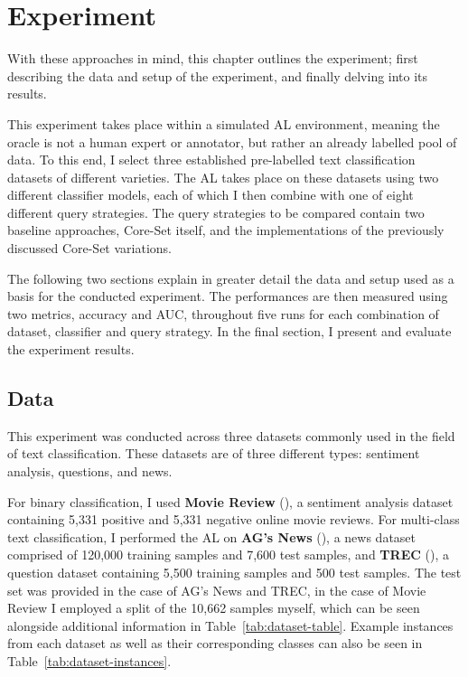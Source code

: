 \documentclass[english,bachelor,ul]{webisthesis} %
\begin{document}
\chapter{Experiment}

With these approaches in mind, this chapter outlines the experiment; first describing the data and setup of the experiment, and finally delving into its results. 

This experiment takes place within a simulated AL environment, meaning the oracle is not a human expert or annotator, but rather an already labelled pool of data. To this end, I select three established pre-labelled text classification datasets of different varieties. The AL takes place on these datasets using two different classifier models, each of which I then combine with one of eight different query strategies. The query strategies to be compared contain two baseline approaches, Core-Set itself, and the implementations of the previously discussed Core-Set variations. 

The following two sections explain in greater detail the data and setup used as a basis for the conducted experiment. The performances are then measured using two metrics, accuracy and AUC, throughout five runs for each combination of dataset, classifier and query strategy. In the final section, I present and evaluate the experiment results.

\section{Data}

This experiment was conducted across three datasets commonly used in the field of text classification. These datasets are of three different types: sentiment analysis, questions, and news. 

For binary classification, I used \textbf{Movie Review} (\cite{DBLP:conf/acl/PangL05}), a sentiment analysis dataset containing 5,331 positive and 5,331 negative online movie reviews. For multi-class text classification, I performed the AL on \textbf{AG's News} (\cite{DBLP:conf/nips/ZhangZL15}), a news dataset comprised of 120,000 training samples and 7,600 test samples, and \textbf{TREC} (\cite{DBLP:journals/nle/LiR06}), a question dataset containing 5,500 training samples and 500 test samples. The test set was provided in the case of AG's News and TREC, in the case of Movie Review I employed a split of the 10,662 samples myself, which can be seen alongside additional information in Table~\ref{tab:dataset-table}. Example instances from each dataset as well as their corresponding classes can also be seen in Table~\ref{tab:dataset-instances}.
\end{document}
